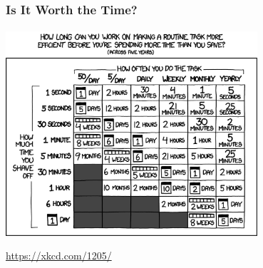 \documentclass[handout, notes=hide]{beamer}
\begin{document}
\begin{frame}
\end{frame}
 

\begin{frame}
\frametitle{Is It Worth the Time?}
\framesubtitle{}
\setlength{\parskip}{0.5em}

{%

\centering
\includegraphics[width=0.7\textwidth]{xkcd-automation}

}%

{\tiny \url{https://xkcd.com/1205/}}

\end{frame}
\note{
\setlength{\parskip}{0.5em}
}

\end{document}
